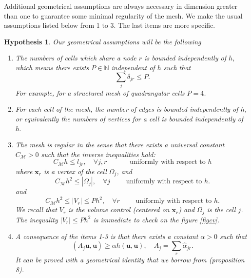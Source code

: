 \documentclass[a4paper,french,english,10pt]{article}
\newcommand\uu{\mathbf{u}}
\newcommand\alj{\widehat{\alpha}_{jr}}
\newcommand\bej{\widehat{\beta}_{jr}}
\newcommand\x{\mathbf{x}}
\newtheorem{hyp}[theorem]{Hypothesis}
\begin{document}
Additional geometrical assumptions are always
necessary in dimension greater than one to guarantee
some minimal regularity of the mesh.
We make  the usual assumptions
 listed below from 1 to 3.
The last items are more specific.


\begin{hyp}\label{geometrie}
Our geometrical assumptions  will be the following
\begin{enumerate}

\item The numbers of cells which share  a node $r$ is
bounded independently of $h$, which means there exists 
$P\in \mathbb N$ independent of $h$ such that
\begin{equation}\label{nbmr} 
\sum_j \delta_{jr}\leq P.
\end{equation}
For example, for a structured mesh of quadrangular cells $P=4$.
 
 \item For  each cell of the mesh, the  number of edges is
bounded independently of $h$, or equivalently the numbers of vertices for a cell
 is bounded independently of $h$.



\item The mesh is regular in the sense that
there exists a universal constant $C_\mathcal M >0$ such that the inverse inequalities hold:
\begin{equation} \label{eq:d5.0}
C_\mathcal M h \leq l_{jr} , \quad \forall j,r \quad \qquad
\mbox{ uniformly with respect to  }h
\end{equation}
where $\mathbf x_r$ is a vertex of the cell $\Omega_j$, 
and 
\begin{equation} \label{eq:d5}
C_\mathcal M h^2 \leq \left| \Omega_j \right| , \quad \forall j\qquad
\mbox{ uniformly with respect to  }h.
\end{equation}
and  
\begin{equation} \label{eq:d5.2}
C_\mathcal M h^2 \leq \vert V_r \vert \leq P h^2, \quad \forall r\qquad
\mbox{ uniformly with respect to  }h.
\end{equation}
We recall that $V_r$ is the volume control (centered on $\x_r$) and $\Omega_j$
is the cell $j$. The inequality $\vert V_r \vert \leq P h^2$ is immediate to check on the figure \ref{figcv}.

\item 
A consequence of the items 1-3 
is that there exists 
 a constant
$\alpha >0 $ such that 
\begin{equation}\label{geom4}
(A_j\uu, \uu)\geq \alpha h (\uu,\uu), \quad A_j=\sum_r\alj.
\end{equation}
It can be proved with a geometrical  identity that we borrow
 from \cite{de10}  (proposition 8).
%
%



\end{enumerate}
\end{hyp}
\end{document}
